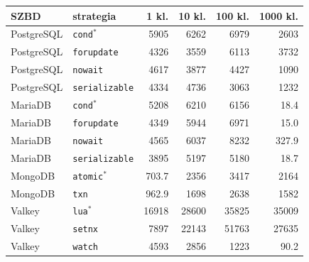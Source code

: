 \begin{tabular}{llrrrr}
\toprule
SZBD & strategia & 1 kl. & 10 kl. & 100 kl. & 1000 kl. \\
\midrule
PostgreSQL & \texttt{cond$^{*}$} & \num{5905} & \num{6262} & \num{6979} & \num{2603} \\
PostgreSQL & \texttt{forupdate} & \num{4326} & \num{3559} & \num{6113} & \num{3732} \\
PostgreSQL & \texttt{nowait} & \num{4617} & \num{3877} & \num{4427} & \num{1090} \\
PostgreSQL & \texttt{serializable} & \num{4334} & \num{4736} & \num{3063} & \num{1232} \\
MariaDB & \texttt{cond$^{*}$} & \num{5208} & \num{6210} & \num{6156} & \num{18.4} \\
MariaDB & \texttt{forupdate} & \num{4349} & \num{5944} & \num{6971} & \num{15.0} \\
MariaDB & \texttt{nowait} & \num{4565} & \num{6037} & \num{8232} & \num{327.9} \\
MariaDB & \texttt{serializable} & \num{3895} & \num{5197} & \num{5180} & \num{18.7} \\
MongoDB & \texttt{atomic$^{*}$} & \num{703.7} & \num{2356} & \num{3417} & \num{2164} \\
MongoDB & \texttt{txn} & \num{962.9} & \num{1698} & \num{2638} & \num{1582} \\
Valkey & \texttt{lua$^{*}$} & \num{16918} & \num{28600} & \num{35825} & \num{35009} \\
Valkey & \texttt{setnx} & \num{7897} & \num{22143} & \num{51763} & \num{27635} \\
Valkey & \texttt{watch} & \num{4593} & \num{2856} & \num{1223} & \num{90.2} \\
\bottomrule
\end{tabular}
